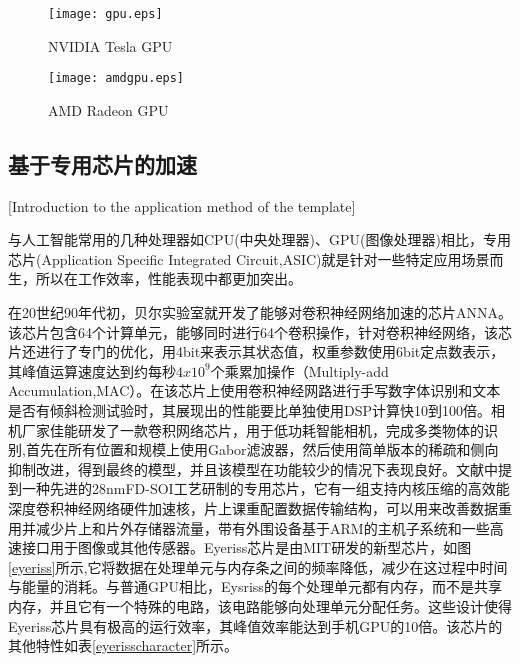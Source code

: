 \begin{figure}[h]
\begin{minipage}{0.5\linewidth}
\centering
\texttt{[image: gpu.eps]}
\caption{NVIDIA Tesla GPU}
\label{nvdiagpu}
\end{minipage}
\begin{minipage}{0.5\linewidth}
\centering
\texttt{[image: amdgpu.eps]}
\caption{AMD Radeon GPU}
\label{amdgpu}
\end{minipage}
\end{figure}

\subsection{基于专用芯片的加速}[Introduction to the application method of the template]

与人工智能常用的几种处理器如CPU(中央处理器)、GPU(图像处理器)相比，专用芯片(Application Specific Integrated Circuit,ASIC)就是针对一些特定应用场景而生，所以在工作效率，性能表现中都更加突出。

在20世纪90年代初，贝尔实验室就开发了能够对卷积神经网络加速的芯片ANNA\cite{boser1991analog}。该芯片包含64个计算单元，能够同时进行64个卷积操作，针对卷积神经网络，该芯片还进行了专门的优化，用4bit来表示其状态值，权重参数使用6bit定点数表示，其峰值运算速度达到约每秒$4x10^{9}$个乘累加操作（Multiply-add Accumulation,MAC）\cite{chen2013,sackinger1992application}。在该芯片上使用卷积神经网路进行手写数字体识别和文本是否有倾斜检测试验时，其展现出的性能要比单独使用DSP计算快10到100倍。相机厂家佳能研发了一款卷积网络芯片，用于低功耗智能相机，完成多类物体的识别,首先在所有位置和规模上使用Gabor滤波器，然后使用简单版本的稀疏和侧向抑制改进，得到最终的模型，并且该模型在功能较少的情况下表现良好\cite{mutch2006multiclass}。文献\cite{desoli201714}中提到一种先进的28nmFD-SOI工艺研制的专用芯片，它有一组支持内核压缩的高效能深度卷积神经网络硬件加速核，片上课重配置数据传输结构，可以用来改善数据重用并减少片上和片外存储器流量，带有外围设备基于ARM的主机子系统和一些高速接口用于图像或其他传感器。Eyeriss芯片\cite{chen2017eyeriss}是由MIT研发的新型芯片，如图\ref{eyeriss}所示,它将数据在处理单元与内存条之间的频率降低，减少在这过程中时间与能量的消耗。与普通GPU相比，Eysriss的每个处理单元都有内存，而不是共享内存，并且它有一个特殊的电路，该电路能够向处理单元分配任务。这些设计使得Eyeriss芯片具有极高的运行效率，其峰值效率能达到手机GPU的10倍。该芯片的其他特性如表\ref{eyerisscharacter}所示。

